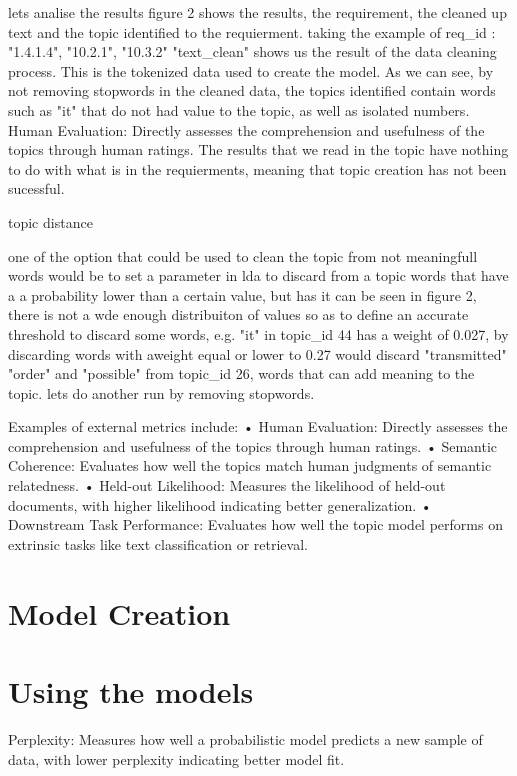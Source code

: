 lets analise the results
figure 2 shows the results, the requirement, the cleaned up text and the topic identified to the requierment.
taking the example of req_id : "1.4.1.4", "10.2.1", "10.3.2"
"text_clean" shows us the result of the data cleaning process. This is the tokenized data used to create the model. 
As we can see, by not removing stopwords in the cleaned data, the topics identified contain words such as "it" that do not had value to the topic, as well as isolated numbers.
Human Evaluation: Directly assesses the comprehension and usefulness of the topics through human ratings.
The results that we read in the topic have nothing to do with what is in the requierments, meaning that topic creation has not been sucessful.

topic distance





one of the option that could be used to clean the topic from not meaningfull words would be to set a parameter in lda to discard from a topic words that have a a probability lower than a certain value, but has it can be seen in figure 2, there is not a wde enough distribuiton of values so as to define an accurate threshold to discard some words, e.g. "it" in topic_id 44 has a weight of 0.027, by discarding words with aweight equal or lower to 0.27 would discard "transmitted" "order" and "possible" from topic_id 26, words that can add meaning to the topic. 
lets do another run by removing stopwords.





Examples of external metrics include:
• Human Evaluation: Directly assesses the comprehension and usefulness of the topics through human ratings.
• Semantic Coherence: Evaluates how well the topics match human judgments of semantic relatedness.
• Held-out Likelihood: Measures the likelihood of held-out documents, with higher likelihood indicating better generalization.
• Downstream Task Performance: Evaluates how well the topic model performs on extrinsic tasks like text classification or retrieval.



\section{Model Creation}
\section{Using the models}
Perplexity: Measures how well a probabilistic model predicts a new sample of data, with
lower perplexity indicating better model fit.


